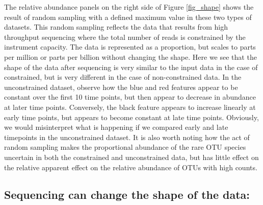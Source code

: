 \documentclass[twocolumn]{article}
\begin{document}
The relative abundance panels on the right side of Figure
\ref{fig_shape} shows the result of random sampling with a defined
maximum value in these two types of datasets. This random sampling
reflects the data that results from high throughput sequencing where the
total number of reads is constrained by the instrument capacity. The
data is represented as a proportion, but scales to parts per million or
parts per billion without changing the shape. Here we see that the shape
of the data after sequencing is very similar to the input data in the
case of constrained, but is very different in the case of
non-constrained data. In the unconstrained dataset, observe how the blue
and red features appear to be constant over the first 10 time points,
but then appear to decrease in abundance at later time points.
Conversely, the black feature appears to increase linearly at early time
points, but appears to become constant at late time points. Obviously,
we would misinterpret what is happening if we compared early and late
timepoints in the unconstrained dataset. It is also worth noting how the
act of random sampling makes the proportional abundance of the rare OTU
species uncertain in both the constrained and unconstrained data, but
has little effect on the relative apparent effect on the relative
abundance of OTUs with high counts.

\subsection{Sequencing can change the shape of the
data:}\label{sequencing-can-change-the-shape-of-the-data}
\end{document}
